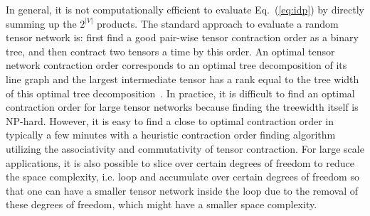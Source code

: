\documentclass[onefignum, onetabnum]{siamart190516}
\newcommand{\<}{\langle}
\renewcommand{\>}{\rangle}
\newcommand{\Eq}[1]{Eq.~(\ref{#1})}
\newcommand{\blue}[1]{[{\bf  \color{blue}{JG: #1}}]}
\newcommand{\purple}[1]{[{\bf  \color{purple}{MC: #1}}]}
\begin{document}
In general, it is not computationally efficient to evaluate \Eq{eq:idp} by directly summing up the $2^{|V|}$ products. %
The standard approach to evaluate a random tensor network is: first find a good pair-wise tensor contraction order as a binary tree, and then contract two tensors a time by this order.
An optimal tensor network contraction order corresponds to an optimal tree decomposition of its line graph and the largest intermediate tensor has a rank equal to the tree width of this optimal tree decomposition~\cite{Markov2008}.
In practice, it is difficult to find an optimal contraction order for large tensor networks because finding the treewidth itself is NP-hard.
However, it is easy to find a close to optimal contraction order in typically a few minutes with a heuristic contraction order finding algorithm~\cite{Kourtis2019,Kalachev2021} utilizing the associativity and commutativity of tensor contraction.
For large scale applications, it is also possible to slice over certain degrees of freedom to reduce the space complexity, i.e.
loop and accumulate over certain degrees of freedom so that one can have a smaller tensor network inside the loop due to the removal of these degrees of freedom, which might have a smaller space complexity.
\end{document}
